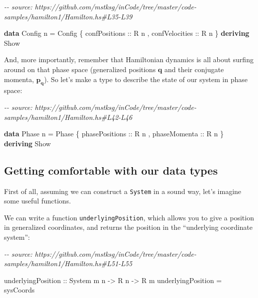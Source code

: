\documentclass[]{article}
\newenvironment{Shaded}{}{}
\newcommand{\CommentTok}[1]{\textcolor[rgb]{0.38,0.63,0.69}{\textit{#1}}}
\newcommand{\DataTypeTok}[1]{\textcolor[rgb]{0.56,0.13,0.00}{#1}}
\newcommand{\KeywordTok}[1]{\textcolor[rgb]{0.00,0.44,0.13}{\textbf{#1}}}
\newcommand{\NormalTok}[1]{#1}
\newcommand{\OtherTok}[1]{\textcolor[rgb]{0.00,0.44,0.13}{#1}}
\begin{document}
\begin{Shaded}
\begin{Highlighting}[]
\CommentTok{{-}{-} source: https://github.com/mstksg/inCode/tree/master/code{-}samples/hamilton1/Hamilton.hs\#L35{-}L39}

\KeywordTok{data} \DataTypeTok{Config}\NormalTok{ n }\OtherTok{=} \DataTypeTok{Config}
\NormalTok{    \{}\OtherTok{ confPositions  ::} \DataTypeTok{R}\NormalTok{ n}
\NormalTok{    ,}\OtherTok{ confVelocities ::} \DataTypeTok{R}\NormalTok{ n}
\NormalTok{    \}}
  \KeywordTok{deriving} \DataTypeTok{Show}
\end{Highlighting}
\end{Shaded}

And, more importantly, remember that Hamiltonian dynamics is all about surfing
around on that phase space (generalized positions \(\mathbf{q}\) and their
conjugate momenta, \(\mathbf{p_q}\)). So let's make a type to describe the state
of our system in phase space:

\begin{Shaded}
\begin{Highlighting}[]
\CommentTok{{-}{-} source: https://github.com/mstksg/inCode/tree/master/code{-}samples/hamilton1/Hamilton.hs\#L42{-}L46}

\KeywordTok{data} \DataTypeTok{Phase}\NormalTok{ n }\OtherTok{=} \DataTypeTok{Phase}
\NormalTok{    \{}\OtherTok{ phasePositions ::} \DataTypeTok{R}\NormalTok{ n}
\NormalTok{    ,}\OtherTok{ phaseMomenta   ::} \DataTypeTok{R}\NormalTok{ n}
\NormalTok{    \}}
  \KeywordTok{deriving} \DataTypeTok{Show}
\end{Highlighting}
\end{Shaded}

\subsection{Getting comfortable with our data
types}\label{getting-comfortable-with-our-data-types}

First of all, assuming we can construct a \texttt{System} in a sound way, let's
imagine some useful functions.

We can write a function \texttt{underlyingPosition}, which allows you to give a
position in generalized coordinates, and returns the position in the
``underlying coordinate system'':

\begin{Shaded}
\begin{Highlighting}[]
\CommentTok{{-}{-} source: https://github.com/mstksg/inCode/tree/master/code{-}samples/hamilton1/Hamilton.hs\#L51{-}L55}

\NormalTok{underlyingPosition}
\OtherTok{    ::} \DataTypeTok{System}\NormalTok{ m n}
    \OtherTok{{-}\textgreater{}} \DataTypeTok{R}\NormalTok{ n}
    \OtherTok{{-}\textgreater{}} \DataTypeTok{R}\NormalTok{ m}
\NormalTok{underlyingPosition }\OtherTok{=}\NormalTok{ sysCoords}
\end{Highlighting}
\end{Shaded}
\end{document}
